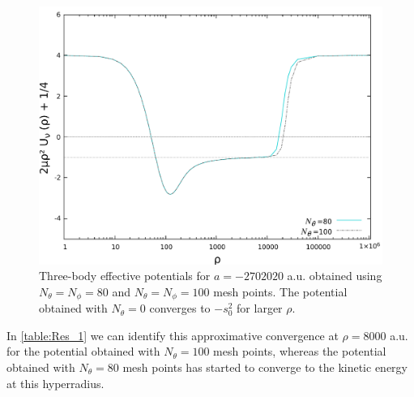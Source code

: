 \begin{figure}
	\includegraphics[width=\linewidth]{diffdiff.pdf}
	\caption{Three-body effective potentials for $a=-2702020$ a.u. obtained using $N_{\theta}=N_{\phi}=80$ and $N_{\theta}=N_{\phi}=100$ mesh points. The potential obtained with $N_{\theta}=0$ converges to $-s_0^2$ for larger $\rho$.}
	\label{fig:res_4}
\end{figure}
In \cref{table:Res_1} we can identify this approximative convergence at $\rho=8000$ a.u. for the potential obtained with $N_{\theta}=100$ mesh points, whereas the potential obtained with $N_{\theta}=80$ mesh points has started to converge to the kinetic energy at this hyperradius.  

